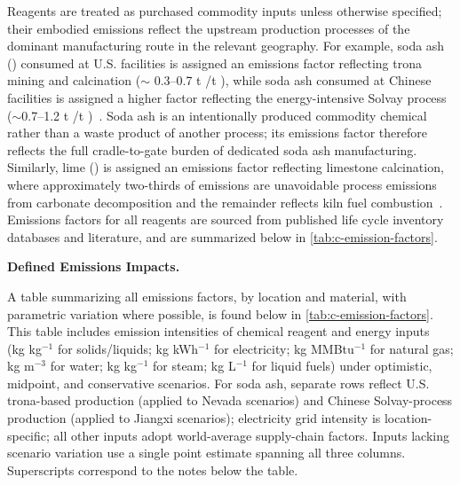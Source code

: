 \documentclass{article}
\renewcommand\_{\textunderscore\allowbreak}
\begin{document}
Reagents are treated as purchased commodity inputs unless otherwise specified; their embodied emissions reflect the upstream production processes of the dominant manufacturing route in the relevant geography. For example, soda ash () consumed at U.S. facilities is assigned an emissions factor reflecting trona mining and calcination ($\sim$ 0.3--0.7 t /t ), while soda ash consumed at Chinese facilities is assigned a higher factor reflecting the energy-intensive Solvay process ($\sim$0.7--1.2 t /t )~\cite{wangGreenhouseGasesRegulated2024, scottCanSyntheticSoda2023, royLithiumClayAssessing2024}. Soda ash is an intentionally produced commodity chemical rather than a waste product of another process; its emissions factor therefore reflects the full cradle-to-gate burden of dedicated soda ash manufacturing. Similarly, lime () is assigned an emissions factor reflecting limestone calcination, where approximately two-thirds of emissions are unavoidable process emissions from carbonate decomposition and the remainder reflects kiln fuel combustion~\cite{lavegliaDecarbonizingLimebasedConstruction2023}. Emissions factors for all reagents are sourced from published life cycle inventory databases and literature, and are summarized below in \ref{tab:c-emission-factors}.

\medskip
\noindent\textbf{Defined Emissions Impacts.}\quad

A table summarizing all emissions factors, by location and material, with parametric variation where possible, is found below in \ref{tab:c-emission-factors}. This table includes emission intensities of chemical reagent and energy inputs (kg\,\,kg$^{-1}$ for solids/liquids; kg\,\,kWh$^{-1}$ for electricity; kg\,\,MMBtu$^{-1}$ for natural gas; kg\,\,m$^{-3}$ for water; kg\,\,kg$^{-1}$ for steam; kg\,\,L$^{-1}$ for liquid fuels) under optimistic, midpoint, and conservative scenarios. For soda ash, separate rows reflect U.S. trona-based production (applied to Nevada scenarios) and Chinese Solvay-process production (applied to Jiangxi scenarios); electricity grid intensity is location-specific; all other inputs adopt world-average supply-chain factors. Inputs lacking scenario variation use a single point estimate spanning all three columns. Superscripts correspond to the notes below the table.
\end{document}
